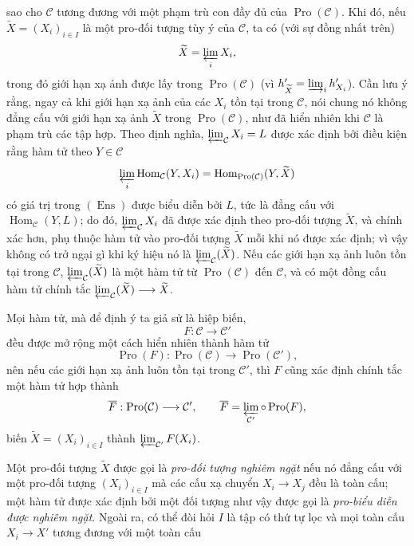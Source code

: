 sao cho $\mathcal C$ tương đương với một phạm trù con đầy đủ của
$\operatorname{Pro}(\mathcal C)$. Khi đó, nếu
$\widetilde X=(X_i)_{i\in I}$ là một pro-đối tượng tùy ý của $\mathcal C$, ta
có (với sự đồng nhất trên)
\[
  \widetilde X=\varprojlim_i X_i,
\]
trong đó giới hạn xạ ảnh được lấy trong $\operatorname{Pro}(\mathcal C)$
(vì $h'_{\widetilde X}=\varinjlim_i h'_{X_i}$). Cần lưu ý rằng, ngay cả khi
giới hạn xạ ảnh của các $X_i$ tồn tại trong $\mathcal C$, nói chung nó không
đẳng cấu với giới hạn xạ ảnh $\widetilde X$ trong
$\operatorname{Pro}(\mathcal C)$, như đã hiển nhiên khi $\mathcal C$ là phạm
trù các tập hợp. Theo định nghĩa,
$\varprojlim_{\mathcal C}X_i=L$ được xác định bởi điều kiện rằng hàm tử theo
$Y\in\mathcal C$
\[
  \varprojlim_i\operatorname{Hom}_{\mathcal C}(Y,X_i)
  =\operatorname{Hom}_{\operatorname{Pro}(\mathcal C)}(Y,\widetilde X)
\]
có giá trị trong $(\operatorname{Ens})$ được biểu diễn bởi $L$, tức là đẳng
cấu với $\operatorname{Hom}_{\mathcal C}(Y,L)$; do đó,
$\varprojlim_{\mathcal C}X_i$ đã được xác định theo pro-đối tượng
$\widetilde X$, và chính xác hơn, phụ thuộc hàm tử vào pro-đối tượng
$\widetilde X$ mỗi khi nó được xác định; vì vậy không có trở ngại gì khi ký
hiệu nó là $\varprojlim_{\mathcal C}(\widetilde X)$. Nếu các giới hạn xạ ảnh
luôn tồn tại trong $\mathcal C$,
$\varprojlim_{\mathcal C}(\widetilde X)$ là một hàm tử từ
$\operatorname{Pro}(\mathcal C)$ đến $\mathcal C$, và có một đồng cấu hàm tử
chính tắc
$\varprojlim_{\mathcal C}(\widetilde X)\longrightarrow\widetilde X$.

Mọi hàm tử, mà để định ý ta giả sử là hiệp biến,
\[
  F:\mathcal C\longrightarrow\mathcal C'
\]
đều được mở rộng một cách hiển nhiên thành hàm tử
\[
  \operatorname{Pro}(F):\operatorname{Pro}(\mathcal C)
  \longrightarrow\operatorname{Pro}(\mathcal C'),
\]
nên nếu các giới hạn xạ ảnh luôn tồn tại trong $\mathcal C'$, thì $F$ cũng
xác định chính tắc một hàm tử hợp thành
\[
  \overline F:\operatorname{Pro}(\mathcal C)\longrightarrow\mathcal C',
  \qquad
  \overline F=\varprojlim_{\mathcal C'}\circ\operatorname{Pro}(F),
\]
biến $\widetilde X=(X_i)_{i\in I}$ thành
$\varprojlim_{\mathcal C'}F(X_i)$.

Một pro-đối tượng $\widetilde X$ được gọi là \emph{pro-đối tượng nghiêm ngặt}
nếu nó đẳng cấu với một pro-đối tượng $(X_i)_{i\in I}$ mà các cấu xạ chuyển
$X_i\longrightarrow X_j$ đều là toàn cấu; một hàm tử được xác định bởi một
đối tượng như vậy được gọi là \emph{pro-biểu diễn được nghiêm ngặt}. Ngoài
ra, có thể đòi hỏi $I$ là tập có thứ tự lọc và mọi toàn cấu
$X_i\longrightarrow X'$ tương đương với một toàn cấu

